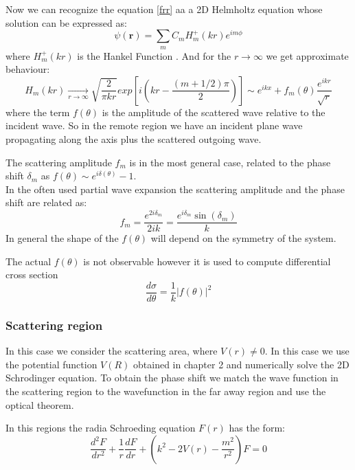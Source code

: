Now we can recognize the equation \eqref{frr} aa a 2D Helmholtz equation whose solution can be expressed as:
\begin{equation}\label{2DS2H}
\psi(\mathbf{r}) = \sum_{m}{C_mH_m^+(kr)e^{im\phi}}
\end{equation}
where $ H_m^+(kr) $ is the Hankel Function .
And for the $ r \rightarrow \infty $ we get approximate behaviour:
\begin{equation}\label{2DS2}
    H_m(kr) \xrightarrow[r \rightarrow \infty]{}\sqrt{\frac{2}{\pi k r}}exp\left[i\left(kr - \frac{(m + 1/2)\pi}{2}\right)\right] \sim e^{ikx} + f_m(\theta) \frac{e^{ikr}}{\sqrt{r}}
\end{equation}
where the term $ f(\theta) $ is the amplitude of the scattered wave relative to the incident wave. 
So in the remote region we have an incident plane wave propagating along the axis plus the scattered outgoing wave.

The scattering amplitude $ f_m $ is in the most general case, related to the phase shift $ \delta_m $ as $ f(\theta) \sim e^{i\delta(\theta)} - 1 $. \\
In the often used partial wave expansion the scattering amplitude and the phase shift are related as:
\begin{equation}
    f_m = \frac{e^{2i \delta_m}}{2ik} = \frac{e^{i\delta_m}\sin(\delta_m)}{k}
\end{equation}
In general the shape of the $ f(\theta) $ will depend on the symmetry of the system.

The actual $ f(\theta) $ is not observable however it is used to compute differential cross section
\begin{equation}
    \frac{d\sigma}{d\theta} = \frac{1}{k}\left|f(\theta)\right|^2
\end{equation}

\subsubsection{\textbf{Scattering region}}

In this case we consider the scattering area, where $ V(r) \neq 0 $. In this case we use the potential function $ V(R) $ obtained in chapter 2 and numerically solve the 2D Schrodinger equation. To obtain the phase shift we match the wave function in the scattering region to the wavefunction in the far away region and use the optical theorem.

In this regions the radia Schroeding equation $ F(r) $ has the form:
\begin{equation}\label{frrSr}
\frac{d^2 F}{dr^2} + \frac{1}{r}\frac{dF}{dr} + \left(k^2 - 2V(r) - \frac{m^2}{r^2}\right)F = 0
\end{equation}


